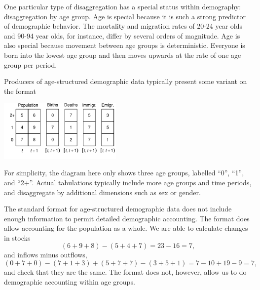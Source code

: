 \documentclass[USenglish]{article}
\begin{document}
One particular type of disaggregation has a special status within demography: disaggregation by age group. Age is special because it is such a strong predictor of demographic behavior. The mortality and migration rates of 20-24 year olds and 90-94 year olds, for instance, differ by several orders of magnitude. Age is also special because movement between age groups is deterministic. Everyone is born into the lowest age group and then moves upwards at the rate of one age group per period.

Producers of age-structured demographic data typically present some variant on the format
\begin{center}
\includegraphics[width=0.45\textwidth]{figures_accounts/fig_account_withage_nolex}
\end{center}
For simplicity, the diagram here only shows three age groups, labelled ``0'', ``1'', and ``2+''. Actual tabulations typically include more age groups and time periods, and disaggregate by additional dimensions such as sex or gender.

The standard format for age-structured demographic data does not include enough information to permit detailed demographic accounting. The format does allow accounting for the population as a whole. We are able to calculate changes in stocks
\begin{equation*}
    (6+9+8)-(5+4+7) = 23 - 16 = 7,
\end{equation*}
and inflows minus outflows, 
\begin{equation*}
    (0+7+0)-(7+1+3)+(5+7+7)-(3+5+1) = 7 - 10 + 19 - 9 = 7,
\end{equation*}
and check that they are the same. The format does not, however, allow us to do demographic accounting within age groups. 
\end{document}
